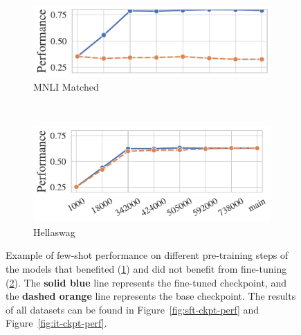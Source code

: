 \begin{figure}[t!]
    \begin{subfigure}[b]{0.5\textwidth}
    \centering
    \includegraphics[width=0.8\columnwidth]{figures/fig_files/sft_evalmnli_matched-trainmnli_tight.pdf}
        \caption{MNLI Matched}
        \label{fig:subfig:improve}
    \end{subfigure}%
    \\
    \begin{subfigure}[b]{0.5\textwidth}
        \centering
    \includegraphics[width=0.8\columnwidth]{figures/fig_files/it_evalhellaswag_tight.pdf}
        \caption{Hellaswag}
        \label{fig:subfig:notimprove}
    \end{subfigure}
    \caption{Example of few-shot performance on different pre-training steps of the models that benefited (\ref{fig:subfig:improve}) and did not benefit from fine-tuning (\ref{fig:subfig:notimprove}). The \textcolor{snsblue}{\textbf{solid blue}} line represents the fine-tuned checkpoint, and the \textcolor{snsorange}{\textbf{dashed orange}} line represents the base checkpoint. The results of all datasets can be found in Figure~\ref{fig:sft-ckpt-perf} and Figure~\ref{fig:it-ckpt-perf}.}
    \label{fig:improve-and-notimprove-example}
\end{figure}